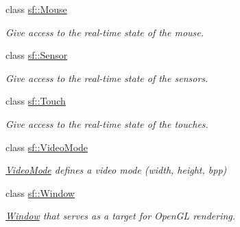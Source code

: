 \begin{DoxyCompactItemize}
class \hyperlink{classsf_1_1_mouse}{sf\-::\-Mouse}
\begin{DoxyCompactList}\small\item\em Give access to the real-\/time state of the mouse. \end{DoxyCompactList}\item 
class \hyperlink{classsf_1_1_sensor}{sf\-::\-Sensor}
\begin{DoxyCompactList}\small\item\em Give access to the real-\/time state of the sensors. \end{DoxyCompactList}\item 
class \hyperlink{classsf_1_1_touch}{sf\-::\-Touch}
\begin{DoxyCompactList}\small\item\em Give access to the real-\/time state of the touches. \end{DoxyCompactList}\item 
class \hyperlink{classsf_1_1_video_mode}{sf\-::\-Video\-Mode}
\begin{DoxyCompactList}\small\item\em \hyperlink{classsf_1_1_video_mode}{Video\-Mode} defines a video mode (width, height, bpp) \end{DoxyCompactList}\item 
class \hyperlink{classsf_1_1_window}{sf\-::\-Window}
\begin{DoxyCompactList}\small\item\em \hyperlink{classsf_1_1_window}{Window} that serves as a target for Open\-G\-L rendering. \end{DoxyCompactList}\end{DoxyCompactItemize}
